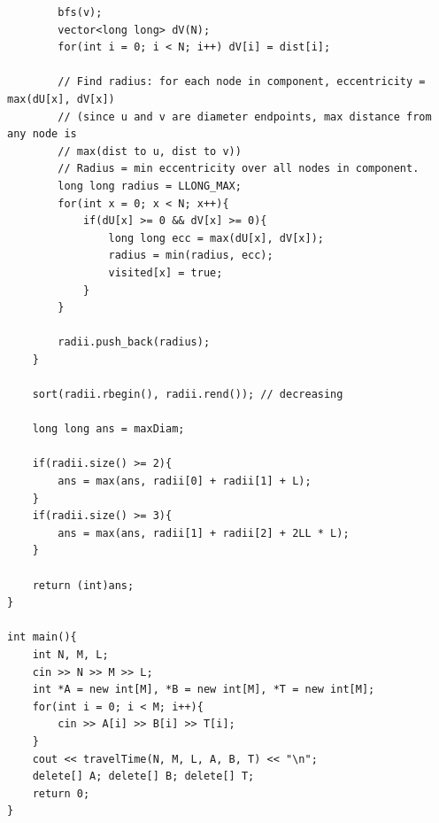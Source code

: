 \documentclass[11pt,a4paper]{article}
\begin{document}
\begin{lstlisting}
        bfs(v);
        vector<long long> dV(N);
        for(int i = 0; i < N; i++) dV[i] = dist[i];

        // Find radius: for each node in component, eccentricity = max(dU[x], dV[x])
        // (since u and v are diameter endpoints, max distance from any node is
        // max(dist to u, dist to v))
        // Radius = min eccentricity over all nodes in component.
        long long radius = LLONG_MAX;
        for(int x = 0; x < N; x++){
            if(dU[x] >= 0 && dV[x] >= 0){
                long long ecc = max(dU[x], dV[x]);
                radius = min(radius, ecc);
                visited[x] = true;
            }
        }

        radii.push_back(radius);
    }

    sort(radii.rbegin(), radii.rend()); // decreasing

    long long ans = maxDiam;

    if(radii.size() >= 2){
        ans = max(ans, radii[0] + radii[1] + L);
    }
    if(radii.size() >= 3){
        ans = max(ans, radii[1] + radii[2] + 2LL * L);
    }

    return (int)ans;
}

int main(){
    int N, M, L;
    cin >> N >> M >> L;
    int *A = new int[M], *B = new int[M], *T = new int[M];
    for(int i = 0; i < M; i++){
        cin >> A[i] >> B[i] >> T[i];
    }
    cout << travelTime(N, M, L, A, B, T) << "\n";
    delete[] A; delete[] B; delete[] T;
    return 0;
}
\end{lstlisting}
\end{document}
